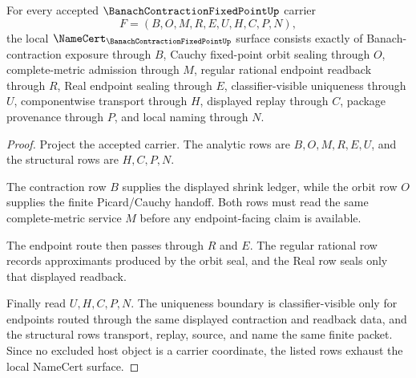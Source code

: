 \begin{theorem}
\label{thm:banach-contraction-fixed-point-namecert-obligations}
For every accepted $\BanachContractionFixedPointUp$ carrier
$$
F=(B,O,M,R,E,U,H,C,P,N),
$$
the local $\NameCert_{\BanachContractionFixedPointUp}$ surface consists exactly of Banach-contraction exposure through $B$, Cauchy fixed-point orbit sealing through $O$, complete-metric admission through $M$, regular rational endpoint readback through $R$, Real endpoint sealing through $E$, classifier-visible uniqueness through $U$, componentwise transport through $H$, displayed replay through $C$, package provenance through $P$, and local naming through $N$.
\end{theorem}
\begin{proof}
Project the accepted carrier. The analytic rows are $B,O,M,R,E,U$, and the structural rows are $H,C,P,N$.

The contraction row $B$ supplies the displayed shrink ledger, while the orbit row $O$ supplies the finite Picard/Cauchy handoff. Both rows must read the same complete-metric service $M$ before any endpoint-facing claim is available.

The endpoint route then passes through $R$ and $E$. The regular rational row records approximants produced by the orbit seal, and the Real row seals only that displayed readback.

Finally read $U,H,C,P,N$. The uniqueness boundary is classifier-visible only for endpoints routed through the same displayed contraction and readback data, and the structural rows transport, replay, source, and name the same finite packet. Since no excluded host object is a carrier coordinate, the listed rows exhaust the local NameCert surface.
\end{proof}

